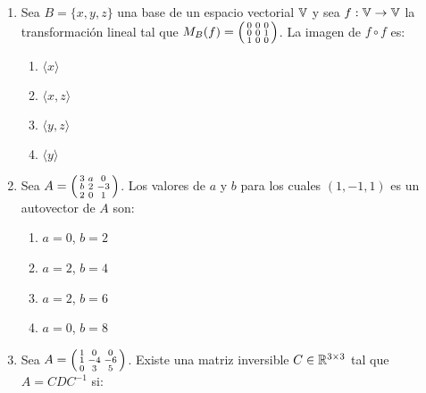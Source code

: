 \documentclass[../practica.root.tex]{subfiles}
\begin{document}
\begin{enumerate}
          \hrulefill{}
    \item Sea $B=\{x,y,z\}$ una base de un espacio vectorial $\mathbb{V}$ y sea
          $f:\mathbb{V}\to\mathbb{V}$ la transformación lineal tal que
          $M_B(f)=\begin{psmallmatrix}0&0&0\\0&0&1\\1&0&0\end{psmallmatrix}$. La
          imagen de $f\circ f$ es:

          \begin{enumerate}
              \item $\langle x\rangle$
              \item $\langle x,z\rangle$
              \item $\langle y,z\rangle$
              \item $\langle y\rangle$
          \end{enumerate}

          \hrulefill{}
    \item Sea $A=\begin{psmallmatrix}3&a&0\\b&2&-3\\2&0&1\end{psmallmatrix}$.
          Los valores de $a$ y $b$ para los cuales $(1,-1,1)$ es un autovector de
          $A$ son:

          \begin{enumerate}
              \item $a=0$, $b=2$
              \item $a=2$, $b=4$
              \item $a=2$, $b=6$
              \item $a=0$, $b=8$
          \end{enumerate}

          \hrulefill{}
    \item Sea $A=\begin{psmallmatrix}1&0&0\\1&-4&-6\\0&3&5\end{psmallmatrix}$.
          Existe una matriz inversible $C\in\mathbb{R}^{3\times 3}$ tal que $A=CDC^{-1}$
          si:


\end{enumerate}
\end{document}
